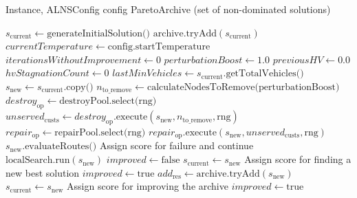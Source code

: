 \documentclass[a4paper,12pt]{article}
\begin{document}
\begin{algorithm}[H]
\caption{ALNS Main Loop}
\begin{algorithmic}[1]
\Require Instance, ALNSConfig config
\Ensure ParetoArchive (set of non-dominated solutions)

\State $s_{\text{current}} \gets \text{generateInitialSolution()}$
\State $\text{archive.tryAdd}(s_{\text{current}})$
\State $currentTemperature \gets \text{config.startTemperature}$
\State $iterationsWithoutImprovement \gets 0$
\State $perturbationBoost \gets 1.0$
\State
{}
\State $previousHV \gets 0.0$
\State $hvStagnationCount \gets 0$
\State $lastMinVehicles \gets s_{\text{current}}.\text{getTotalVehicles()}$
\State
{}
    \State $s_{\text{new}} \gets s_{\text{current}}.\text{copy()}$ 
    \State
    \State $n_{\text{to_remove}} \gets \text{calculateNodesToRemove(perturbationBoost)}$
    \State $destroy_{\text{op}} \gets \text{destroyPool.select(rng)}$
    \State $unserved_{\text{custs}} \gets destroy_{\text{op}}.\text{execute}(s_{\text{new}}, n_{\text{to_remove}}, \text{rng})$
    \State
    \State $repair_{\text{op}} \gets \text{repairPool.select(rng)}$
    \State $repair_{\text{op}}.\text{execute}(s_{\text{new}}, unserved_{\text{custs}}, \text{rng})$
    \State
    \State $s_{\text{new}}.\text{evaluateRoutes()}$ 
    \State
        \State Assign score for failure and continue
    \EndIf
    \State
        \State $\text{localSearch.run}(s_{\text{new}})$ 
    \EndIf
    \State
    \State $improved \gets \text{false}$
        \State $s_{\text{current}} \gets s_{\text{new}}$
        \State Assign score for finding a new best solution
        \State $improved \gets \text{true}$
    \Else
        \State $add_{\text{res}} \gets \text{archive.tryAdd}(s_{\text{new}})$ 
            \State $s_{\text{current}} \gets s_{\text{new}}$ 
            \State Assign score for improving the archive
            \State $improved \gets \text{true}$

\end{algorithmic}
\end{algorithm}
\end{document}
